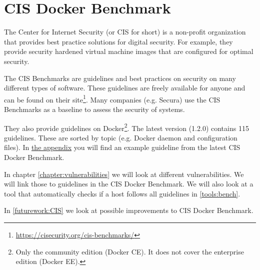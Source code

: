 \section{CIS Docker Benchmark}
The Center for Internet Security (or CIS for short) is a non-profit organization that provides best practice solutions for digital security. For example, they provide security hardened virtual machine images that are configured for optimal security.

\medskip

The CIS Benchmarks are guidelines and best practices on security on many different types of software. These guidelines are freely available for anyone and can be found on their site\footnote{\url{https://cisecurity.org/cis-benchmarks/}}. Many companies (e.g. Secura) use the CIS Benchmarks as a baseline to assess the security of systems.

\medskip

They also provide guidelines on Docker\footnote{Only the community edition (Docker CE). It does not cover the enterprise edition (Docker EE).}. The latest version (1.2.0) contains 115 guidelines. These are sorted by topic (e.g. Docker daemon and configuration files). In \hyperref[appendix:CIS-Benchmark-Example]{the appendix} you will find an example guideline from the latest CIS Docker Benchmark.

In chapter \autoref{chapter:vulnerabilities} we will look at different vulnerabilities. We will link those to guidelines in the CIS Docker Benchmark. We will also look at a tool that automatically checks if a host follows all guidelines in \autoref{tools:bench}.

In \autoref{futurework:CIS} we look at possible improvements to CIS Docker Benchmark.
